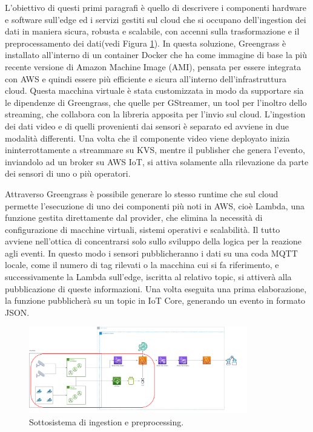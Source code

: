 L'obiettivo di questi primi paragrafi è quello di descrivere i componenti hardware e software sull’edge ed i servizi gestiti sul cloud che si occupano dell’ingestion dei dati in maniera sicura, robusta e scalabile, con accenni sulla trasformazione e il preprocessamento dei dati(vedi Figura \ref{fig:sub-ing}). In questa soluzione, Greengrass è installato all’interno di un container Docker che ha come immagine di base la più recente versione di Amazon Machine Image (AMI), pensata per essere integrata con AWS e quindi essere più efficiente e sicura all’interno dell’infrastruttura cloud. Questa macchina virtuale è stata customizzata in modo da supportare sia le dipendenze di Greengrass, che quelle per GStreamer, un tool per l’inoltro dello streaming, che collabora con la libreria apposita per l'invio sul cloud. L’ingestion dei dati video e di quelli provenienti dai sensori è separato ed avviene in due modalità differenti. Una volta che il componente video viene deployato inizia ininterrottamente a streammare su KVS, mentre il publisher che genera l’evento, inviandolo ad un broker su AWS IoT, si attiva solamente alla rilevazione da parte dei sensori di uno o più operatori. 

Attraverso Greengrass è possibile generare lo stesso runtime che sul cloud permette l’esecuzione di uno dei componenti più noti in AWS, cioè Lambda, una funzione gestita direttamente dal provider, che elimina la necessità di configurazione di macchine virtuali, sistemi operativi e scalabilità. Il tutto avviene nell’ottica di concentrarsi solo sullo sviluppo della logica per la reazione agli eventi. In questo modo i sensori pubblicheranno i dati su una coda MQTT locale, come il numero di tag rilevati o la macchina cui si fa riferimento, e successivamente la Lambda sull'edge, iscritta al relativo topic, si attiverà alla pubblicazione di queste informazioni. Una volta eseguita una prima elaborazione, la funzione pubblicherà su un topic in IoT Core, generando un evento in formato JSON. 

\begin{figure}[htbp]
    \centering
    \includegraphics[width=0.85\textwidth]{figures/sottosistema-ingestion.png}
    \caption{Sottosistema di ingestion e preprocessing.} 
    \label{fig:sub-ing}
\end{figure}

